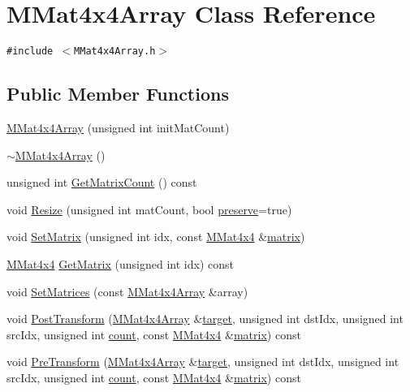 \hypertarget{class_m_mat4x4_array}{
\section{MMat4x4Array Class Reference}
\label{class_m_mat4x4_array}
}
{\tt \#include $<$MMat4x4Array.h$>$}

\subsection*{Public Member Functions}
\begin{CompactItemize}
\item 
\hyperlink{class_m_mat4x4_array_d5f55fe80bba0ebd9f0183fb7b5e1f1b}{MMat4x4Array} (unsigned int initMatCount)
\item 
\hyperlink{class_m_mat4x4_array_17b7e79c2363b5d1e8dbb8fba2273c49}{$\sim$MMat4x4Array} ()
\item 
unsigned int \hyperlink{class_m_mat4x4_array_724cf4773d7aa618baaeb1853e14211e}{GetMatrixCount} () const 
\item 
void \hyperlink{class_m_mat4x4_array_aaf1503ef4d6c009cbddf5cc9c881cd5}{Resize} (unsigned int matCount, bool \hyperlink{glext__bak_8h_ab18b6b796a98c5d960c84f7d59049df}{preserve}=true)
\item 
void \hyperlink{class_m_mat4x4_array_5be2cd90f44b396e64a7715e11e8ac40}{SetMatrix} (unsigned int idx, const \hyperlink{class_m_mat4x4}{MMat4x4} \&\hyperlink{glext__bak_8h_7b24a3f2f56eb1244ae69dacb4fecb6f}{matrix})
\item 
\hyperlink{class_m_mat4x4}{MMat4x4} \hyperlink{class_m_mat4x4_array_d947fe77ec3453921fabc090029279d8}{GetMatrix} (unsigned int idx) const 
\item 
void \hyperlink{class_m_mat4x4_array_2e2597b453cc99481883f83acb7318d5}{SetMatrices} (const \hyperlink{class_m_mat4x4_array}{MMat4x4Array} \&array)
\item 
void \hyperlink{class_m_mat4x4_array_10fca6efd8b664e9622d263f880f5d17}{PostTransform} (\hyperlink{class_m_mat4x4_array}{MMat4x4Array} \&\hyperlink{glext_8h_f9d0cbbbeb7414e786c41899e5a856d7}{target}, unsigned int dstIdx, unsigned int srcIdx, unsigned int \hyperlink{wglext_8h_98d18d6b4e3ba4ed266c6fb54c839d70}{count}, const \hyperlink{class_m_mat4x4}{MMat4x4} \&\hyperlink{glext__bak_8h_7b24a3f2f56eb1244ae69dacb4fecb6f}{matrix}) const 
\item 
void \hyperlink{class_m_mat4x4_array_7e24ecc0ea807c875855e82030039e73}{PreTransform} (\hyperlink{class_m_mat4x4_array}{MMat4x4Array} \&\hyperlink{glext_8h_f9d0cbbbeb7414e786c41899e5a856d7}{target}, unsigned int dstIdx, unsigned int srcIdx, unsigned int \hyperlink{wglext_8h_98d18d6b4e3ba4ed266c6fb54c839d70}{count}, const \hyperlink{class_m_mat4x4}{MMat4x4} \&\hyperlink{glext__bak_8h_7b24a3f2f56eb1244ae69dacb4fecb6f}{matrix}) const 

\end{CompactItemize}
